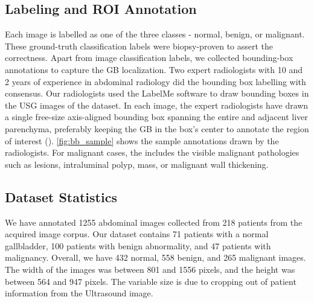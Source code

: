 \subsection{Labeling and ROI Annotation}
%
Each image is labelled as one of the three classes - normal, benign, or malignant. These ground-truth classification labels were biopsy-proven to assert the correctness. Apart from image classification labels, we collected bounding-box annotations to capture the GB localization. Two expert radiologists with 10 and 2 years of experience in abdominal radiology did the bounding box labelling with consensus. Our radiologists used the LabelMe \cite{russell2008labelme} software to draw bounding boxes in the USG images of the dataset. In each image, the expert radiologists have drawn a single free-size axis-aligned bounding box spanning the entire \gb and adjacent liver parenchyma, preferably keeping the GB in the box's center to annotate the region of interest (\roi). \cref{fig:bb_sample} shows the sample \roi annotations drawn by the radiologists. For malignant cases, the \roi includes the visible malignant pathologies such as lesions, intraluminal polyp, mass, or malignant \gb wall thickening. 


\subsection{Dataset Statistics}
%
We have annotated 1255 abdominal \usg images collected from 218 patients from the acquired image corpus. Our dataset contains 71 patients with a normal gallbladder, 100 patients with benign abnormality, and 47 patients with malignancy. Overall, we have 432 normal, 558 benign, and 265 malignant images. The width of the images was between 801 and 1556 pixels, and the height was between 564 and 947 pixels. The variable size is due to cropping out of patient information from the Ultrasound image.

